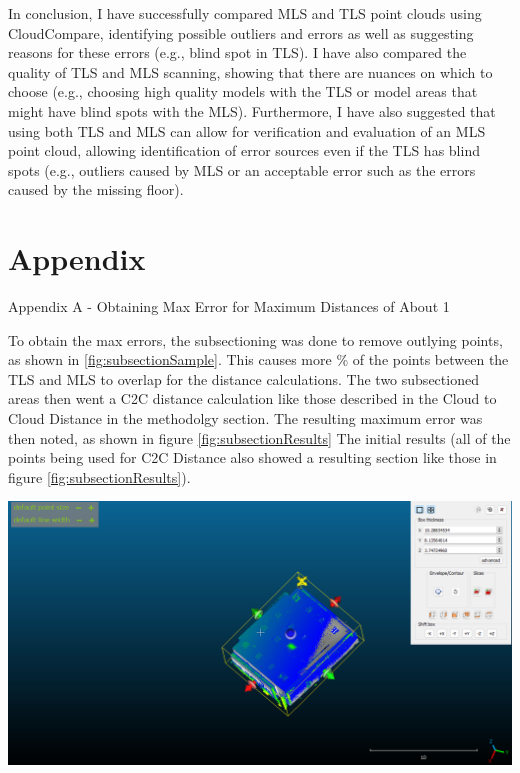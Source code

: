 \documentclass[man]{apa7}
\begin{document}
In conclusion, I have successfully compared MLS and TLS point clouds using CloudCompare, identifying possible outliers and errors as well as suggesting reasons for these errors (e.g., blind spot in TLS). I have also compared the quality of TLS and MLS scanning, showing that there are nuances on which to choose (e.g., choosing high quality models with the TLS or model areas that might have blind spots with the MLS). Furthermore, I have also suggested that using both TLS and MLS can allow for verification and evaluation of an MLS point cloud, allowing identification of error sources even if the TLS has blind spots (e.g., outliers caused by MLS or an acceptable error such as the errors caused by the missing floor).

\printbibliography

\newpage

\section{Appendix}
Appendix A - Obtaining Max Error for Maximum Distances of About 1

To obtain the max errors, the subsectioning was done to remove outlying points, as shown in \ref{fig:subsectionSample}. This causes more \% of the points between the TLS and MLS to overlap for the distance calculations. The two subsectioned areas then went a C2C distance calculation like those described in the Cloud to Cloud Distance in the methodolgy section. The resulting maximum error was then noted, as shown in figure \ref{fig:subsectionResults} The initial results (all of the points being used for C2C Distance also showed a resulting section like those in figure \ref{fig:subsectionResults}).

\begin{minipage}{\linewidth}
  \includegraphics[height=\textheight/6 ,width=\textwidth/2]{figures/exampleSubsectioning.png}
  \label{fig:subsectionSample}
\end{minipage}
\end{document}

